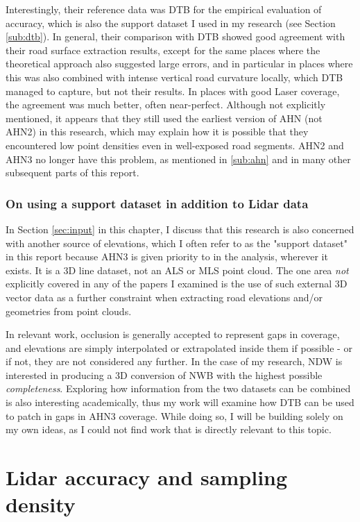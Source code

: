 Interestingly, their reference data was DTB for the empirical evaluation of accuracy, which is also the support dataset I used in my research (see Section \ref{sub:dtb}). In general, their comparison with DTB showed good agreement with their road surface extraction results, except for the same places where the theoretical approach also suggested large errors, and in particular in places where this was also combined with intense vertical road curvature locally, which DTB managed to capture, but not their results. In places with good Laser coverage, the agreement was much better, often near-perfect. Although not explicitly mentioned, it appears that they still used the earliest version of AHN (not AHN2) in this research, which may explain how it is possible that they encountered low point densities even in well-exposed road segments. AHN2 and AHN3 no longer have this problem, as mentioned in \ref{sub:ahn} and in many other subsequent parts of this report.

\subsubsection{On using a support dataset in addition to Lidar data}

In Section \ref{sec:input} in this chapter, I discuss that this research is also concerned with  another source of elevations, which I often refer to as the "support dataset" in this report because AHN3 is given priority to in the analysis, wherever it exists. It is a 3D line dataset, not an ALS or MLS point cloud. The one area \textit{not} explicitly covered in any of the papers I examined is the use of such external 3D vector data as a further constraint when extracting road elevations and/or geometries from point clouds.

In relevant work, occlusion is generally accepted to represent gaps in coverage, and elevations are simply interpolated or extrapolated inside them if possible - or if not, they are not considered any further. In the case of my research, NDW is interested in producing a 3D conversion of NWB with the highest possible \textit{completeness}. Exploring how information from the two datasets can be combined is also interesting academically, thus my work will examine how DTB can be used to patch in gaps in AHN3 coverage. While doing so, I will be building solely on my own ideas, as I could not find work that is directly relevant to this topic.

\section{Lidar accuracy and sampling density}
\label{sec:lidaraccuracy}

